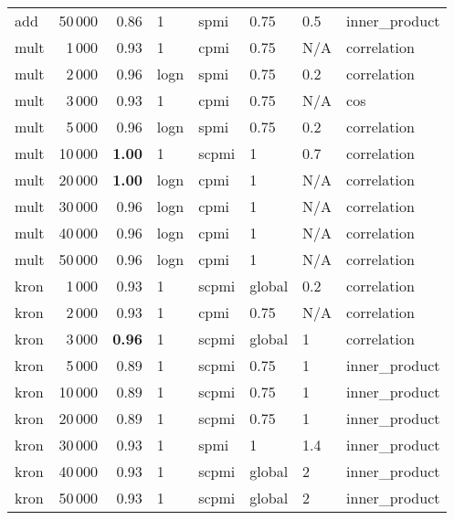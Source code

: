\begin{tabular}{lrrlllll}
     add &           50\,000 &       0.86 &     1 &   spmi &    0.75 &  0.5 &  inner\_product \\ \addlinespace
    mult &            1\,000 &       0.93 &     1 &   cpmi &    0.75 &  N/A &    correlation \\
    mult &            2\,000 &       0.96 &  logn &   spmi &    0.75 &  0.2 &    correlation \\
    mult &            3\,000 &       0.93 &     1 &   cpmi &    0.75 &  N/A &            cos \\
    mult &            5\,000 &       0.96 &  logn &   spmi &    0.75 &  0.2 &    correlation \\
    mult &           10\,000 &       \textbf{1.00} &     1 &  scpmi &       1 &  0.7 &    correlation \\
    mult &           20\,000 &       \textbf{1.00} &  logn &   cpmi &       1 &  N/A &    correlation \\
    mult &           30\,000 &       0.96 &  logn &   cpmi &       1 &  N/A &    correlation \\
    mult &           40\,000 &       0.96 &  logn &   cpmi &       1 &  N/A &    correlation \\
    mult &           50\,000 &       0.96 &  logn &   cpmi &       1 &  N/A &    correlation \\ \addlinespace
    kron &            1\,000 &       0.93 &     1 &  scpmi &  global &  0.2 &    correlation \\
    kron &            2\,000 &       0.93 &     1 &   cpmi &    0.75 &  N/A &    correlation \\
    kron &            3\,000 &       \textbf{0.96} &     1 &  scpmi &  global &    1 &    correlation \\
    kron &            5\,000 &       0.89 &     1 &  scpmi &    0.75 &    1 &  inner\_product \\
    kron &           10\,000 &       0.89 &     1 &  scpmi &    0.75 &    1 &  inner\_product \\
    kron &           20\,000 &       0.89 &     1 &  scpmi &    0.75 &    1 &  inner\_product \\
    kron &           30\,000 &       0.93 &     1 &   spmi &       1 &  1.4 &  inner\_product \\
    kron &           40\,000 &       0.93 &     1 &  scpmi &  global &    2 &  inner\_product \\
    kron &           50\,000 &       0.93 &     1 &  scpmi &  global &    2 &  inner\_product \\
\bottomrule
\end{tabular}
